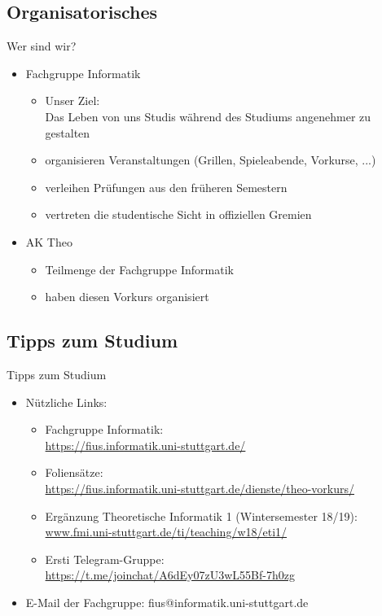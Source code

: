 \subsection{Organisatorisches}
\begin{frame}[fragile]{Wer sind wir?}
    \begin{itemize}
        \item
            Fachgruppe Informatik
            \begin{itemize}
                \item Unser Ziel: \\
                Das Leben von uns Studis während des Studiums angenehmer zu gestalten
                \item organisieren Veranstaltungen (Grillen, Spieleabende, Vorkurse, ...)
                \item verleihen Prüfungen aus den früheren Semestern
                \item vertreten die studentische Sicht in offiziellen Gremien
            \end{itemize}
        \item AK Theo
        \begin{itemize}
            \item Teilmenge der Fachgruppe Informatik
            \item haben diesen Vorkurs organisiert
        \end{itemize}
    \end{itemize}
\end{frame}

\subsection{Tipps zum Studium}
\begin{frame}[fragile]{Tipps zum Studium}
    \begin{itemize}
        \item Nützliche Links:\\
            \begin{itemize}
                \item Fachgruppe Informatik:\\
                \url{https://fius.informatik.uni-stuttgart.de/}
                \item Foliensätze:\\ \url{https://fius.informatik.uni-stuttgart.de/dienste/theo-vorkurs/}
                \item Ergänzung Theoretische Informatik 1 (Wintersemester 18/19): \\
                \url{www.fmi.uni-stuttgart.de/ti/teaching/w18/eti1/}
                \item Ersti Telegram-Gruppe:\\
                \url{https://t.me/joinchat/A6dEy07zU3wL55Bf-7h0zg}
        	\end{itemize}
        \item E-Mail der Fachgruppe: fius@informatik.uni-stuttgart.de

    \end{itemize}
\end{frame}
